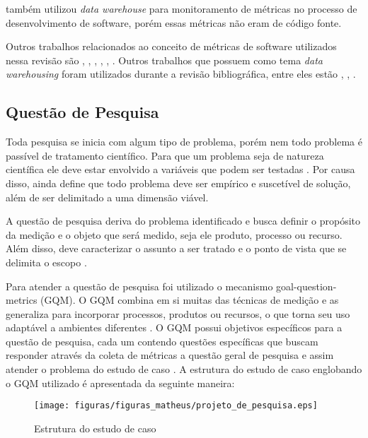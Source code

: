  também utilizou \textit{data warehouse} para monitoramento de métricas no processo de desenvolvimento de software, porém essas métricas não eram de código fonte.

Outros trabalhos relacionados ao conceito de métricas de software utilizados nessa revisão são , , , , , . Outros trabalhos que possuem como tema \textit{data warehousing} foram utilizados durante a revisão bibliográfica, entre eles estão  , , . 



\subsection{Questão de Pesquisa}

Toda pesquisa se inicia com algum tipo de problema, porém nem todo problema é passível de tratamento científico. Para que um problema seja de natureza científica ele deve estar envolvido a variáveis que podem ser testadas \cite{gil_como_2002}. Por causa disso,  ainda define que todo problema deve ser empírico e suscetível de solução, além de ser delimitado a uma dimensão viável.

A questão de pesquisa deriva do problema identificado e busca definir o propósito da medição e o objeto que será medido, seja ele produto, processo ou recurso. Além disso, deve caracterizar o assunto a ser tratado e o ponto de vista que se delimita o escopo \cite{Basili96b} \cite{caldiera_goal_1994}.

Para atender a questão de pesquisa foi utilizado o mecanismo goal-question-metrics (GQM). O GQM combina em si muitas das técnicas de medição e as generaliza para incorporar processos, produtos ou recursos, o que torna seu uso adaptável a ambientes diferentes \cite{caldiera_goal_1994}. O GQM possui objetivos específicos para a questão de pesquisa, cada um contendo questões específicas que buscam responder através da coleta de métricas a questão geral de pesquisa e assim atender o problema do estudo de caso \cite{Basili96b}. A estrutura do estudo de caso englobando o GQM utilizado é apresentada da seguinte maneira:  

\begin{figure}[h!]
\centering
\texttt{[image: figuras/figuras\_matheus/projeto\_de\_pesquisa.eps]}
\caption{Estrutura do estudo de caso}
\label{fig:pesquisa}
\end{figure}
\FloatBarrier

